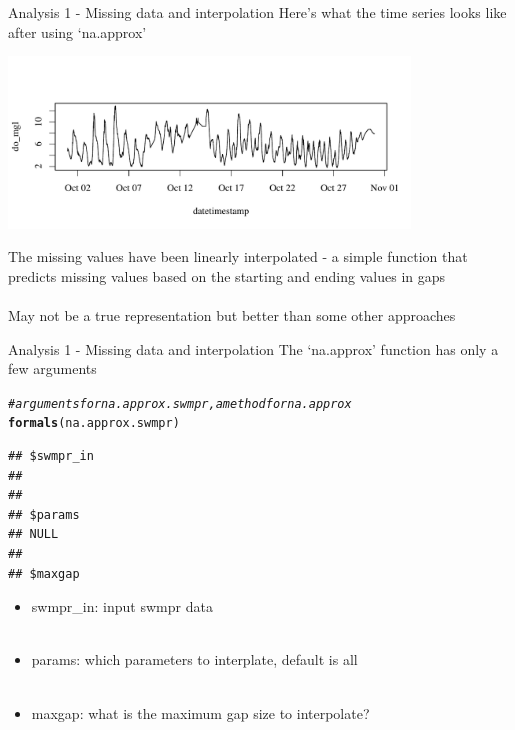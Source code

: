\documentclass[xcolor=svgnames]{beamer}\usepackage[]{graphicx}\usepackage[]{color}
\makeatletter
\newcommand{\hlcom}[1]{\textcolor[rgb]{0.678,0.584,0.686}{\textit{#1}}}%
\newcommand{\hlstd}[1]{\textcolor[rgb]{0.345,0.345,0.345}{#1}}%
\newcommand{\hlkwd}[1]{\textcolor[rgb]{0.737,0.353,0.396}{\textbf{#1}}}%
\newenvironment{kframe}{%
 \def\at@end@of@kframe{}%
 \ifinner\ifhmode%
  \def\at@end@of@kframe{\end{minipage}}%
  \begin{minipage}{\columnwidth}%
 \fi\fi%
 \def\FrameCommand##1{\hskip\@totalleftmargin \hskip-\fboxsep
 \colorbox{shadecolor}{##1}\hskip-\fboxsep
     \hskip-\linewidth \hskip-\@totalleftmargin \hskip\columnwidth}%
 \MakeFramed {\advance\hsize-\width
   \@totalleftmargin\z@ \linewidth\hsize
   \@setminipage}}%
 {\par\unskip\endMakeFramed%
 \at@end@of@kframe}
\newenvironment{knitrout}{}{} %
\makeatother
\begin{document}
\begin{frame}[containsverbatim]{Analysis 1 - Missing data and interpolation}
Here's what the time series looks like after using `na.approx'
\begin{knitrout}\scriptsize
{}\color{fgcolor}

{\centering \includegraphics[width=0.8\textwidth]{figure/unnamed-chunk-12} 

}



\end{knitrout}
The missing values have been linearly interpolated - a simple function that predicts missing values based on the starting and ending values in gaps\\~\\
May not be a true representation but better than some other approaches
\end{frame}

\begin{frame}[containsverbatim]{Analysis 1 - Missing data and interpolation}
The `na.approx' function has only a few arguments
\begin{knitrout}\scriptsize
{}\color{fgcolor}\begin{kframe}
\begin{alltt}
\hlcom{# arguments for na.approx.swmpr, a method for na.approx}
\hlkwd{formals}\hlstd{(na.approx.swmpr)}
\end{alltt}
\begin{verbatim}
## $swmpr_in
## 
## 
## $params
## NULL
## 
## $maxgap
\end{verbatim}
\end{kframe}
\end{knitrout}
\begin{itemize}
\item swmpr\_in: input swmpr data \\~\\
\item params: which parameters to interplate, default is all \\~\\
\item maxgap: what is the maximum gap size to interpolate?
\end{itemize}
\end{frame}
\end{document}
